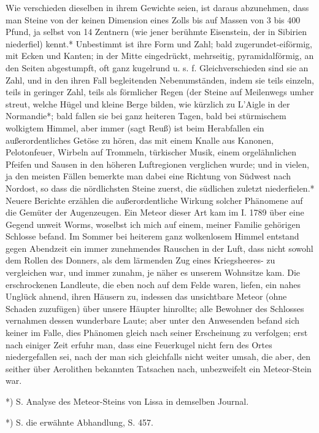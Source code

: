 \documentclass[a4paper, 11pt, oneside, polutonikogreek, german]{article}
\begin{document}
Wie verschieden dieselben in ihrem Gewichte seien, ist daraus abzunehmen, dass man Steine von der keinen Dimension eines Zolls bis auf Massen von 3 bis 400 Pfund, ja selbst von 14 Zentnern (wie jener berühmte Eisenstein, der in Sibirien niederfiel) kennt.* Unbestimmt ist ihre Form und Zahl; bald zugerundet-eiförmig, mit Ecken und Kanten; in der Mitte eingedrückt, mehrseitig, pyramidalförmig, an den Seiten abgestumpft, oft ganz kugelrund u. s. f. Gleichverschieden sind sie an Zahl, und in den ihren Fall begleitenden Nebenumständen, indem sie teils einzeln, teils in geringer Zahl, teils als förmlicher Regen (der Steine auf Meilenwegs umher streut, welche Hügel und kleine Berge bilden, wie kürzlich zu L’Aigle in der Normandie*; bald fallen sie bei ganz heiteren Tagen, bald bei stürmischem wolkigtem Himmel, aber immer (sagt Reuß) ist beim Herabfallen ein außerordentliches Getöse zu hören, das mit einem Knalle aus Kanonen, Pelotonfeuer, Wirbeln auf Trommeln, türkischer Musik, einem orgelähnlichen Pfeifen und Sausen in den höheren Luftregionen verglichen wurde; und in vielen, ja den meisten Fällen bemerkte man dabei eine Richtung von Südwest nach Nordost, so dass die nördlichsten Steine zuerst, die südlichen zuletzt niederfielen.* Neuere Berichte erzählen die außerordentliche Wirkung solcher Phänomene auf die Gemüter der Augenzeugen. Ein Meteor dieser Art kam im I. 1789 über eine Gegend unweit Worms, woselbst ich mich auf einem, meiner Familie gehörigen Schlosse befand. Im Sommer bei heiterem ganz wolkenlosem Himmel entstand gegen Abendzeit ein immer zunehmendes Rauschen in der Luft, dass nicht sowohl dem Rollen des Donners, als dem lärmenden Zug eines Kriegsheeres- zu vergleichen war, und immer zunahm, je näher es unserem Wohnsitze kam. Die erschrockenen Landleute, die eben noch auf dem Felde waren, liefen, ein nahes Unglück ahnend, ihren Häusern zu, indessen das unsichtbare Meteor (ohne Schaden zuzufügen) über unsere Häupter hinrollte; alle Bewohner des Schlosses vernahmen dessen wunderbare Laute; aber unter den Anwesenden befand sich keiner im Falle, dies Phänomen gleich nach seiner Erscheinung zu verfolgen; erst nach einiger Zeit erfuhr man, dass eine Feuerkugel nicht fern des Ortes niedergefallen sei, nach der man sich gleichfalls nicht weiter umsah, die aber, den seither über Aerolithen bekannten Tatsachen nach, unbezweifelt ein Meteor-Stein war.

*) S. Analyse des Meteor-Steins von Lissa in demselben Journal.

*) S. die erwähnte Abhandlung, S. 457.
\end{document}
